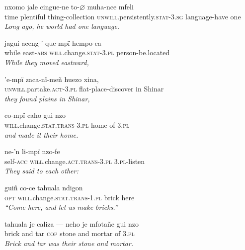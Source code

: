\documentclass{article}[10pt]
\begin{document}
\begin{exe}
\ex
\gll nxomo jale cingue-ne to-$\varnothing$ muha-nce mfeli\\
time plentiful thing-collection \textsc{unwill}.persistently.\textsc{stat}-3.\textsc{sg} language-have one\\
\trans \emph{Long ago, he world had one language.}

\ex
\gll jagui aceng-' que-mp\"{i} hempo-ca\\
while east-\textsc{abs} \textsc{will}.change.\textsc{stat}-3.\textsc{pl} person-be.located\\
\trans \emph{While they moved eastward,}

\ex
\gll 'e-mp\"{i} zaca-n\"{i}-me\~{n} huezo xina,\\
\textsc{unwill}.partake.\textsc{act}-3.\textsc{pl} flat-place-discover in Shinar\\
\trans \emph{they found plains in Shinar,}

\ex
\gll co-mp\"{i} caho gui nzo\\
\textsc{will}.change.\textsc{stat}.\textsc{trans}-3.\textsc{pl} home of 3.\textsc{pl}\\
\trans \emph{and made it their home.}

\ex
\gll ne-'n li-mp\"{i} nzo-fe\\
self-\textsc{acc} \textsc{will}.change.\textsc{act}.\textsc{trans}-3.\textsc{pl} 3.\textsc{pl}-listen\\
\trans \emph{They said to each other:}

\ex
\gll gui\~{n} co-ce tahuala ndigon\\
\textsc{opt} \textsc{will}.change.\textsc{stat}.\textsc{trans}-1.\textsc{pl} brick here\\
\trans \emph{``Come here, and let us make bricks.''}

\ex
\gll tahuala je caliza --- neho je mfota\~{n}e gui nzo\\
brick and tar \textsc{cop} stone and mortar of 3.\textsc{pl}\\
\trans \emph{Brick and tar was their stone and mortar.}
\end{exe}
\end{document}

